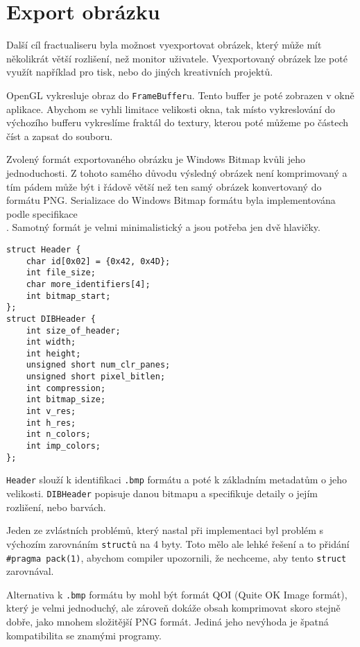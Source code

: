 \section{Export obrázku}
Další cíl fractualiseru byla možnost vyexportovat obrázek, který může mít
několikrát větší rozlišení, než monitor uživatele. Vyexportovaný obrázek
lze poté využít například pro tisk, nebo do jiných kreativních projektů.

OpenGL vykresluje obraz do \texttt{FrameBuffer}u. Tento buffer je poté
zobrazen v okně aplikace. Abychom se vyhli limitace velikosti okna, tak
místo vykreslování do výchozího bufferu vykreslíme fraktál do textury,
kterou poté můžeme po částech číst a zapsat do souboru.

Zvolený formát exportovaného obrázku je Windows Bitmap kvůli jeho
jednoduchosti. Z tohoto samého důvodu výsledný obrázek není komprimovaný a tím
pádem může být i řádově větší než ten samý obrázek konvertovaný do formátu PNG.
Serializace do Windows Bitmap formátu byla implementována podle specifikace \\
\textcite{bitmapstorage}. Samotný formát je velmi minimalistický a jsou potřeba
jen dvě hlavičky.

\begin{lstlisting}
struct Header {
    char id[0x02] = {0x42, 0x4D};
    int file_size;
    char more_identifiers[4];
    int bitmap_start;
};
struct DIBHeader {
    int size_of_header;
    int width;
    int height;
    unsigned short num_clr_panes;
    unsigned short pixel_bitlen;
    int compression;
    int bitmap_size;
    int v_res;
    int h_res;
    int n_colors;
    int imp_colors;
};
\end{lstlisting}

\texttt{Header} slouží k identifikaci \texttt{.bmp} formátu a poté k základním
metadatům o jeho velikosti. \texttt{DIBHeader} popisuje danou bitmapu a
specifikuje detaily o jejím rozlišení, nebo barvách.

Jeden ze zvlástních problémů, který nastal při implementaci byl problém s
výchozím zarovnáním \texttt{struct}ů na 4 byty. Toto mělo ale lehké řešení a to
přidání \texttt{\#pragma pack(1)}, a\-by\-chom compiler upozornili, že nechceme, aby
tento \texttt{struct} zarovnával.

Alternativa k \texttt{.bmp} formátu by mohl být formát QOI (Quite OK Image formát),
který je velmi jednoduchý, ale zároveň dokáže obsah komprimovat skoro stejně dobře,
jako mnohem složitější PNG formát. Jediná jeho nevýhoda je špatná kompatibilita se
znamými programy.
